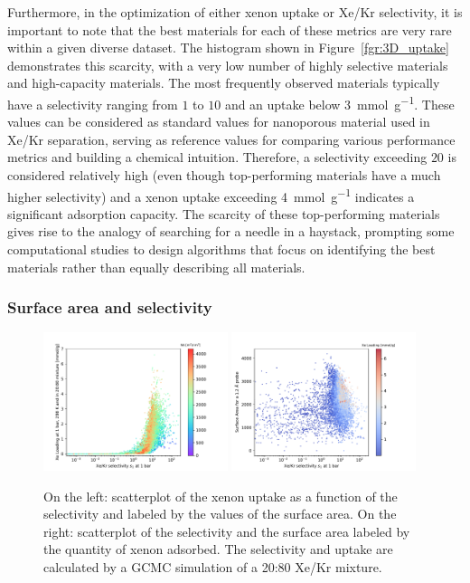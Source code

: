 \documentclass[main.tex]{subfiles}
\begin{document}
Furthermore, in the optimization of either xenon uptake or Xe/Kr selectivity, it is important to note that the best materials for each of these metrics are very rare within a given diverse dataset. The histogram shown in Figure~\ref{fgr:3D_uptake} demonstrates this scarcity, with a very low number of highly selective materials and high-capacity materials. The most frequently observed materials typically have a selectivity ranging from $1$ to $10$ and an uptake below \SI{3}{\milli\mole\per\gram}. These values can be considered as standard values for nanoporous material used in Xe/Kr separation, serving as reference values for comparing various performance metrics and building a chemical intuition. Therefore, a selectivity exceeding $20$ is considered relatively high (even though top-performing materials have a much higher selectivity\autocite{Pei_2022}) and a xenon uptake exceeding \SI{4}{\milli\mole\per\gram} indicates a significant adsorption capacity. The scarcity of these top-performing materials gives rise to the analogy of searching for a needle in a haystack, prompting some computational studies to design algorithms that focus on identifying the best materials rather than equally describing all materials.\autocite{Deshwal_2021,Glasby_2021} 

\subsubsection{Surface area and selectivity}

\begin{figure}[ht!]
  \centering
  \includegraphics[width=0.48\textwidth]{figures/2-thermo/Scatterplot_uptake_selectivity_sa.pdf}
  \hfill
  \includegraphics[width=0.48\textwidth]{figures/2-thermo/Scatterplot_sa_selectivity.pdf}
  \caption{On the left: scatterplot of the xenon uptake as a function of the selectivity and labeled by the values of the surface area. On the right: scatterplot of the selectivity and the surface area labeled by the quantity of xenon adsorbed. The selectivity and uptake are calculated by a GCMC simulation of a 20:80 Xe/Kr mixture.}\label{fgr:sa}
\end{figure}
\end{document}
